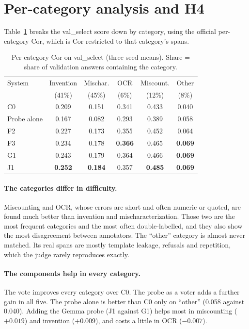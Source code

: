 \section{Per-category analysis and H4}\label{sec:exp-category}

Table~\ref{tab:category} breaks the val\_select score down by category, using the official per-category Cor, which is Cor restricted to that category's spans.

\begin{table}[!htb]
    \centering
    \caption{Per-category Cor on val\_select (three-seed means). Share = share of validation answers containing the category.}
    \label{tab:category}
    \begin{tabular}{lccccc}
    \toprule
    System & Invention & Mischar. & OCR & Miscount. & Other \\
     & (41\%) & (45\%) & (6\%) & (12\%) & (8\%) \\
    \midrule
    C0 & 0.209 & 0.151 & 0.341 & 0.433 & 0.040 \\
    Probe alone & 0.167 & 0.082 & 0.293 & 0.389 & 0.058 \\
    F2 & 0.227 & 0.173 & 0.355 & 0.452 & 0.064 \\
    F3 & 0.234 & 0.178 & \textbf{0.366} & 0.465 & \textbf{0.069} \\
    G1 & 0.243 & 0.179 & 0.364 & 0.466 & \textbf{0.069} \\
    J1 & \textbf{0.252} & \textbf{0.184} & 0.357 & \textbf{0.485} & \textbf{0.069} \\
    \bottomrule
    \end{tabular}
\end{table}

\paragraph{The categories differ in difficulty.}
Miscounting and OCR, whose errors are short and often numeric or quoted, are found much better than invention and mischaracterization. Those two are the most frequent categories and the most often double-labelled, and they also show the most disagreement between annotators. The ``other'' category is almost never matched. Its real spans are mostly template leakage, refusals and repetition, which the judge rarely reproduces exactly.

\paragraph{The components help in every category.}
The vote improves every category over C0. The probe as a voter adds a further gain in all five. The probe alone is better than C0 only on ``other'' (0.058 against 0.040). Adding the Gemma probe (J1 against G1) helps most in miscounting ($+0.019$) and invention ($+0.009$), and costs a little in OCR ($-0.007$).

